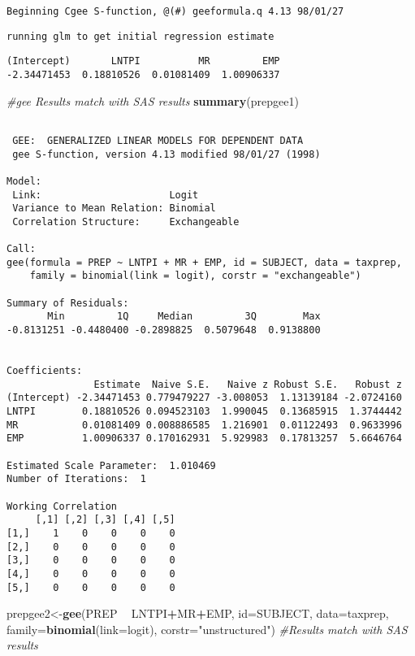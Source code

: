 \documentclass[]{book}
\newenvironment{Shaded}{\begin{snugshade}}{\end{snugshade}}
\newcommand{\CommentTok}[1]{\textcolor[rgb]{0.56,0.35,0.01}{\textit{#1}}}
\newcommand{\DataTypeTok}[1]{\textcolor[rgb]{0.13,0.29,0.53}{#1}}
\newcommand{\KeywordTok}[1]{\textcolor[rgb]{0.13,0.29,0.53}{\textbf{#1}}}
\newcommand{\NormalTok}[1]{#1}
\newcommand{\OperatorTok}[1]{\textcolor[rgb]{0.81,0.36,0.00}{\textbf{#1}}}
\newcommand{\StringTok}[1]{\textcolor[rgb]{0.31,0.60,0.02}{#1}}
\begin{document}
\begin{verbatim}
Beginning Cgee S-function, @(#) geeformula.q 4.13 98/01/27
\end{verbatim}

\begin{verbatim}
running glm to get initial regression estimate
\end{verbatim}

\begin{verbatim}
(Intercept)       LNTPI          MR         EMP 
-2.34471453  0.18810526  0.01081409  1.00906337 
\end{verbatim}

\begin{Shaded}
\begin{Highlighting}[]
\CommentTok{#gee Results match with SAS results}
\KeywordTok{summary}\NormalTok{(prepgee1)}
\end{Highlighting}
\end{Shaded}

\begin{verbatim}

 GEE:  GENERALIZED LINEAR MODELS FOR DEPENDENT DATA
 gee S-function, version 4.13 modified 98/01/27 (1998) 

Model:
 Link:                      Logit 
 Variance to Mean Relation: Binomial 
 Correlation Structure:     Exchangeable 

Call:
gee(formula = PREP ~ LNTPI + MR + EMP, id = SUBJECT, data = taxprep, 
    family = binomial(link = logit), corstr = "exchangeable")

Summary of Residuals:
       Min         1Q     Median         3Q        Max 
-0.8131251 -0.4480400 -0.2898825  0.5079648  0.9138800 


Coefficients:
               Estimate  Naive S.E.   Naive z Robust S.E.   Robust z
(Intercept) -2.34471453 0.779479227 -3.008053  1.13139184 -2.0724160
LNTPI        0.18810526 0.094523103  1.990045  0.13685915  1.3744442
MR           0.01081409 0.008886585  1.216901  0.01122493  0.9633996
EMP          1.00906337 0.170162931  5.929983  0.17813257  5.6646764

Estimated Scale Parameter:  1.010469
Number of Iterations:  1

Working Correlation
     [,1] [,2] [,3] [,4] [,5]
[1,]    1    0    0    0    0
[2,]    0    0    0    0    0
[3,]    0    0    0    0    0
[4,]    0    0    0    0    0
[5,]    0    0    0    0    0
\end{verbatim}

\begin{Shaded}
\begin{Highlighting}[]
\NormalTok{prepgee2<-}\KeywordTok{gee}\NormalTok{(PREP }\OperatorTok{~}\StringTok{ }\NormalTok{LNTPI}\OperatorTok{+}\NormalTok{MR}\OperatorTok{+}\NormalTok{EMP, }\DataTypeTok{id=}\NormalTok{SUBJECT, }\DataTypeTok{data=}\NormalTok{taxprep, }\DataTypeTok{family=}\KeywordTok{binomial}\NormalTok{(}\DataTypeTok{link=}\NormalTok{logit), }\DataTypeTok{corstr=}\StringTok{"unstructured"}\NormalTok{) }\CommentTok{#Results match with SAS results}
\end{Highlighting}
\end{Shaded}
\end{document}
